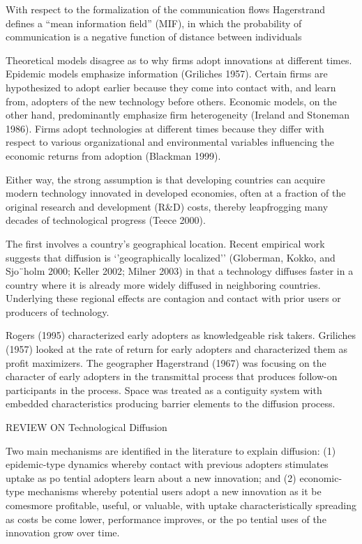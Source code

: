 \documentclass[
  authoryear,
  preprint,
  3p]{elsarticle}
\begin{document}
\citet{grubler1990rise} With respect to the formalization of the
communication flows Hagerstrand defines a ``mean information field''
(MIF), in which the probability of communication is a negative function
of distance between individuals

\citet{perkins2005international} Theoretical models disagree as to why
firms adopt innovations at different times. Epidemic models emphasize
information (Griliches 1957). Certain firms are hypothesized to adopt
earlier because they come into contact with, and learn from, adopters of
the new technology before others. Economic models, on the other hand,
predominantly emphasize firm heterogeneity (Ireland and Stoneman 1986).
Firms adopt technologies at different times because they differ with
respect to various organizational and environmental variables
influencing the economic returns from adoption (Blackman 1999).

Either way, the strong assumption is that developing countries can
acquire modern technology innovated in developed economies, often at a
fraction of the original research and development (R\&D) costs, thereby
leapfrogging many decades of technological progress (Teece 2000).

The first involves a country's geographical location. Recent empirical
work suggests that diffusion is `'geographically localized'' (Globerman,
Kokko, and Sjo¨holm 2000; Keller 2002; Milner 2003) in that a technology
diffuses faster in a country where it is already more widely diffused in
neighboring countries. Underlying these regional effects are contagion
and contact with prior users or producers of technology.

\citet{ding2010modeling} Rogers (1995) characterized early adopters as
knowledgeable risk takers. Griliches (1957) looked at the rate of return
for early adopters and characterized them as profit maximizers. The
geographer Hagerstrand (1967) was focusing on the character of early
adopters in the transmittal process that produces follow-on participants
in the process. Space was treated as a contiguity system with embedded
characteristics producing barrier elements to the diffusion process.

\citet{ding2010modeling} REVIEW ON Technological Diffusion

\citet{perkins2011internet} Two main mechanisms are identified in the
literature to explain diffusion: (1) epidemic-type dynamics whereby
contact with previous adopters stimulates uptake as po tential adopters
learn about a new innovation; and (2) economic-type mechanisms whereby
potential users adopt a new innovation as it be comesmore profitable,
useful, or valuable, with uptake characteristically spreading as costs
be come lower, performance improves, or the po tential uses of the
innovation grow over time.
\end{document}
